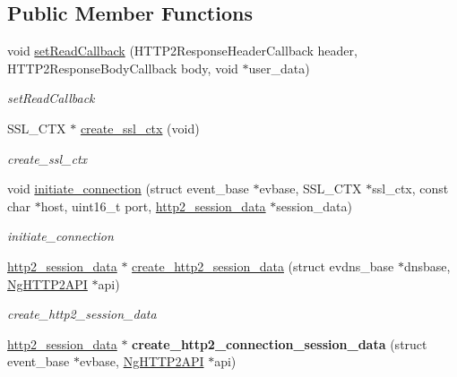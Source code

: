 \subsection*{Public Member Functions}
\begin{DoxyCompactItemize}
\item 
void \hyperlink{classNetwork_1_1HTTP2_1_1NgHTTP2API_a83048a73d75bda59e9f6b1c97039468e}{set\+Read\+Callback} (H\+T\+T\+P2\+Response\+Header\+Callback header, H\+T\+T\+P2\+Response\+Body\+Callback body, void $\ast$user\+\_\+data)
\begin{DoxyCompactList}\small\item\em set\+Read\+Callback \end{DoxyCompactList}\item 
S\+S\+L\+\_\+\+C\+TX $\ast$ \hyperlink{classNetwork_1_1HTTP2_1_1NgHTTP2API_ac6e30f8c88ca773da99ce34724a7dfd0}{create\+\_\+ssl\+\_\+ctx} (void)
\begin{DoxyCompactList}\small\item\em create\+\_\+ssl\+\_\+ctx \end{DoxyCompactList}\item 
void \hyperlink{classNetwork_1_1HTTP2_1_1NgHTTP2API_aaff2b630490f8d10c845996f927fd4d8}{initiate\+\_\+connection} (struct event\+\_\+base $\ast$evbase, S\+S\+L\+\_\+\+C\+TX $\ast$ssl\+\_\+ctx, const char $\ast$host, uint16\+\_\+t port, \hyperlink{structNetwork_1_1HTTP2_1_1http2__session__data}{http2\+\_\+session\+\_\+data} $\ast$session\+\_\+data)
\begin{DoxyCompactList}\small\item\em initiate\+\_\+connection \end{DoxyCompactList}\item 
\hyperlink{structNetwork_1_1HTTP2_1_1http2__session__data}{http2\+\_\+session\+\_\+data} $\ast$ \hyperlink{classNetwork_1_1HTTP2_1_1NgHTTP2API_a83fa51a83722d8aeab16465c937cc41f}{create\+\_\+http2\+\_\+session\+\_\+data} (struct evdns\+\_\+base $\ast$dnsbase, \hyperlink{classNetwork_1_1HTTP2_1_1NgHTTP2API}{Ng\+H\+T\+T\+P2\+A\+PI} $\ast$api)
\begin{DoxyCompactList}\small\item\em create\+\_\+http2\+\_\+session\+\_\+data \end{DoxyCompactList}\item 
\mbox{\label{classNetwork_1_1HTTP2_1_1NgHTTP2API_a1ba3edf107165568b6a0b4138b285ed9}} 
\hyperlink{structNetwork_1_1HTTP2_1_1http2__session__data}{http2\+\_\+session\+\_\+data} $\ast$ {\bfseries create\+\_\+http2\+\_\+connection\+\_\+session\+\_\+data} (struct event\+\_\+base $\ast$evbase, \hyperlink{classNetwork_1_1HTTP2_1_1NgHTTP2API}{Ng\+H\+T\+T\+P2\+A\+PI} $\ast$api)
\end{DoxyCompactItemize}
